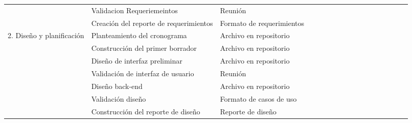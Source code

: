 \begin{table}[H]
\begin{adjustbox}{width={\textwidth},totalheight={\textheight},keepaspectratio}
\begin{tabular}{cp{9.945em}p{9.945em}rrrrrrrrrrrrrr}
    \cline{2-3}  & Validacion Requeriemeintos & Reunión &   & \cellcolor[rgb]{ .851,  .882,  .949} &   & \cellcolor[rgb]{ .851,  .882,  .949} &   & \cellcolor[rgb]{ .851,  .882,  .949} & \cellcolor[rgb]{ .851,  .882,  .949} &   &   &   &   &   &   &  \bigstrut\\
    \cline{2-3}  & Creación del reporte de requerimientos & Formato de requerimientos &   &   &   &   &   & \cellcolor[rgb]{ .557,  .663,  .859} & \cellcolor[rgb]{ .557,  .663,  .859} &   &   &   &   &   &   &  \bigstrut\\
    \cline{1-3}\multicolumn{1}{c}{\multirow{7}[14]{*}{2. Diseño y planificación}} & Planteamiento del cronograma & Archivo en repositorio &   &   &   &   & \cellcolor[rgb]{ 1,  .851,  .4} &   &   & \cellcolor[rgb]{ 1,  .851,  .4} &   &   &   &   &   &  \bigstrut\\
    \cline{2-3}  & Construcción del primer borrador & Archivo en repositorio &   &   & \cellcolor[rgb]{ 1,  .949,  .8} & \cellcolor[rgb]{ 1,  .949,  .8} &   &   &   &   &   &   &   &   &   &  \bigstrut\\
    \cline{2-3}  & Diseño de interfaz preliminar & Archivo en repositorio &   &   &   & \cellcolor[rgb]{ 1,  .851,  .4} & \cellcolor[rgb]{ 1,  .851,  .4} & \cellcolor[rgb]{ 1,  .851,  .4} &   &   &   &   &   &   &   &  \bigstrut\\
    \cline{2-3}  & Validación de interfaz de usuario & Reunión &   &   &   &   & \cellcolor[rgb]{ 1,  .949,  .8} & \cellcolor[rgb]{ 1,  .949,  .8} &   &   &   &   &   &   &   &  \bigstrut\\
    \cline{2-3}  & Diseño back-end & Archivo en repositorio &   &   &   &   & \cellcolor[rgb]{ 1,  .851,  .4} & \cellcolor[rgb]{ 1,  .851,  .4} & \cellcolor[rgb]{ 1,  .851,  .4} & \cellcolor[rgb]{ 1,  .851,  .4} & \cellcolor[rgb]{ 1,  .851,  .4} & \cellcolor[rgb]{ 1,  .851,  .4} & \cellcolor[rgb]{ 1,  .851,  .4} & \cellcolor[rgb]{ 1,  .851,  .4} & \cellcolor[rgb]{ 1,  .851,  .4} & \cellcolor[rgb]{ 1,  .851,  .4} \bigstrut\\
    \cline{2-3}  & Validación diseño & Formato de casos de uso &   &   &   &   &   &   &   &   &   &   & \cellcolor[rgb]{ 1,  .949,  .8} & \cellcolor[rgb]{ 1,  .949,  .8} & \cellcolor[rgb]{ 1,  .949,  .8} & \cellcolor[rgb]{ 1,  .949,  .8} \bigstrut\\
    \cline{2-3}  & Construcción del reporte de diseño & Reporte de diseño &   &   &   &   &   &   &   &   &   &   & \cellcolor[rgb]{ 1,  .851,  .4} & \cellcolor[rgb]{ 1,  .851,  .4} & \cellcolor[rgb]{ 1,  .851,  .4} & \cellcolor[rgb]{ 1,  .851,  .4} \bigstrut\\

\end{tabular}
\end{adjustbox}
\end{table}
